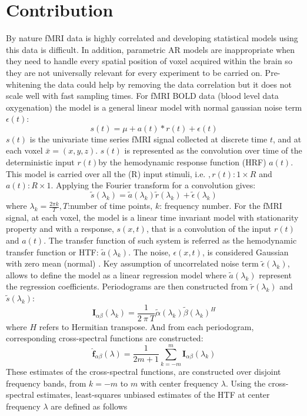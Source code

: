 \documentclass[12pt,twoside]{article}
\begin{document}
\section*{Contribution}
By nature fMRI data is highly correlated and developing statistical models using this data  is difficult.
In addition, parametric AR models are inappropriate when they need to handle every spatial position of voxel acquired within the brain 
so they are not universally relevant for every experiment to be carried on. 
Pre-whitening the data could help by removing the data correlation but it does not scale well with fast sampling times.
For fMRI BOLD data (blood level data oxygenation) the model is a general linear model with normal gaussian noise term $\epsilon(t)$:
\[
	s(t) = \mu + a(t) * r(t) + \epsilon(t)
\]
$s(t)$ is the univariate time series fMRI signal collected at discrete time $t$, and at each voxel $\bar{x}=(x,y,z)$.
$s(t)$ is represented as the convolution over time of the deterministic input $r(t)$by the hemodynamic response function (HRF) $a(t)$.
This model is carried over all the (R) input stimuli, i.e. $,r(t): 1 \times R$ and $a(t): R \times 1$.
Applying the Fourier transform for a convolution gives:
\[
	\tilde{s}(\lambda_k) = \tilde{a} (\lambda_k) \tilde{r}  (\lambda_k) + \tilde{\epsilon}  (\lambda_k) 
\] where $\lambda_k = \frac{2 \pi k}{T}, T$:number of time points, $k$: frequency number.
For the fMRI signal, at each voxel, the model is a linear time invariant model with stationarity property and with a response,
$s(x,t)$, that is a convolution of the input $r(t)$ and $a(t)$.
The transfer function of such system is referred as the hemodynamic transfer function or HTF: $\tilde{a} (\lambda_k)$.
 The noise, $\epsilon(x,t)$, is considered Gaussian with zero mean (normal) .
 Key assumption of uncorrelated noise term $\tilde{\epsilon}  (\lambda_k)$, allows to define the model as a linear regression model
where $\tilde{a} (\lambda_k)$ represent the regression coefficients.
Periodograms are then constructed from $ \tilde{r}  (\lambda_k)$ and $\tilde{s}(\lambda_k)$:
\[
	\textbf{I}_{\alpha\beta}(\lambda_k) = \frac{1}{2~\pi~T} \tilde{\alpha}(\lambda_k) \tilde{\beta}(\lambda_k)^H
\]
where $H$ refers to Hermitian transpose. And from each periodogram, corresponding cross-spectral functions are constructed:
\[
	\hat{\textbf{f}}_{\alpha\beta}(\lambda) = \frac{1}{2m+1} \sum_{k=-m}^m \textbf{I}_{\alpha\beta}(\lambda_k) 
\]
These estimates of the cross-spectral functions, are constructed over disjoint frequency bands, from $k=-m$ to $m$ with center frequency $\lambda$.
Using the cross-spectral estimates, least-squares unbiased estimates of the HTF at center frequency $\lambda$ are defined as follows
\end{document}
